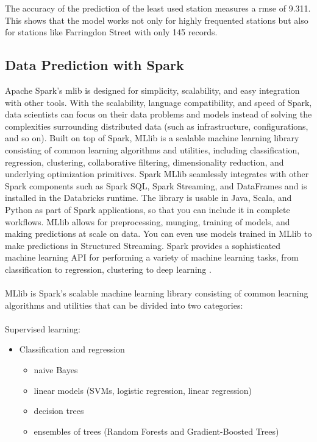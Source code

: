 The accuracy of the prediction of the least used station measures a \acs{rmse} of 9.311. This shows that the model works not only for highly frequented stations but also for stations like Farringdon Street with only 145 records.
\subsection{Data Prediction with Spark}\label{sec:spark}
Apache Spark's \acf{mlib} is designed for simplicity, scalability, and easy
integration with other tools. With the scalability, language compatibility, and speed of Spark,
data scientists can focus on their data problems and models instead of solving the complexities
surrounding distributed data (such as infrastructure, configurations, and so on).
Built on top of Spark, MLlib is a scalable machine learning library consisting of common learning
algorithms and utilities, including classification, regression, clustering, collaborative filtering,
dimensionality reduction, and underlying optimization primitives. Spark MLlib seamlessly
integrates with other Spark components such as Spark SQL, Spark Streaming, and DataFrames
and is installed in the Databricks runtime. The library is usable in Java, Scala, and Python as
part of Spark applications, so that you can include it in complete workflows.
MLlib allows for preprocessing, munging, training of models, and making predictions at scale on
data. You can even use models trained in MLlib to make predictions in Structured Streaming.
Spark provides a sophisticated machine learning API for performing a variety of machine
learning tasks, from classification to regression, clustering to deep learning \cite{Databricks2019}.\\\\
MLlib is Spark’s scalable machine learning library consisting of common learning algorithms and
utilities that can be divided into two categories:\\\\
Supervised learning:
\begin{itemize}
\item Classification and regression
\begin{itemize}
\item naive Bayes
\item linear models (SVMs, logistic regression, linear regression)
\item decision trees
\item ensembles of trees (Random Forests and Gradient-Boosted Trees)
\end{itemize}
\end{itemize}
